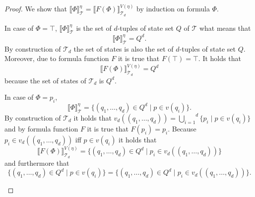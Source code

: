 \begin{proof}
    We show that $\llbracket \Phi \rrbracket^\eta_\mathcal{T} = \llbracket F(\Phi) \rrbracket^{V(\eta)}_{\mathcal{T}_d}$ by induction on formula $\Phi$.
    \begin{compactitem}
        \item In case of $\Phi = \top$, $\llbracket \Phi
        \rrbracket^\eta_\mathcal{T}$ is the set of $d$-tuples of state set $Q$ of $\mathcal{T}$ what means that
        \[\llbracket \Phi \rrbracket^\eta_\mathcal{T} = Q^d.\]
        By construction of $\mathcal{T}_d$ the set of states is also the set of $d$-tuples of state set $Q$.
        Moreover, due to formula function $F$ it is true that $F(\top) = \top$. It holds that
        \[\llbracket F(\Phi) \rrbracket^{V(\eta)}_{\mathcal{T}_d} = Q^d\]
        because the set of states of $\mathcal{T}_d$ is $Q^d$.

        \item In case of $\Phi = p_i$,
        \[\llbracket \Phi
        \rrbracket^\eta_\mathcal{T} = \{(q_1, \dots, q_d)\in Q^d \mid p \in v(q_i)\}.\]
        By construction of $\mathcal{T}_d$ it holds that $v_d((q_1, \dots, q_d)) = \overset{d}{\underset{i = 1}{\bigcup}}\{p_i
        \mid p \in v(q_i)\}$ and by formula function $F$ it is true that $F(p_i) = p_i$. Because $p_i \in v_d((q_1,
        \dots, q_d))$ iff $p \in v(q_i)$ it holds that
        \[\llbracket F(\Phi) \rrbracket^{V(\eta)}_{\mathcal{T}_d} = \{
        (q_1, \dots, q_d) \in Q^d \mid p_i \in v_d((q_1, \dots, q_d))\}\]
        and furthermore that
        \[\{(q_1, \dots, q_d)\in Q^d \mid p \in v(q_i)\} =\{(q_1, \dots, q_d) \in Q^d \mid p_i \in
        v_d((q_1, \dots, q_d))\}.\]


\end{compactitem}
\end{proof}
